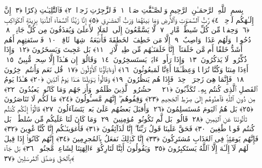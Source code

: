 
  
    
  
    
    

\nopagebreak
  بِسمِ ٱللَّهِ ٱلرَّحمَـٰنِ ٱلرَّحِيمِ
  وَٱلصَّـٰٓفَّٰتِ صَفًّۭا ﴿١﴾
 فَٱلزَّٰجِرَٰتِ زَجرًۭا ﴿٢﴾
 فَٱلتَّٰلِيَـٰتِ ذِكرًا ﴿٣﴾
 إِنَّ إِلَـٰهَكُم لَوَٟحِدٌۭ ﴿٤﴾
 رَّبُّ ٱلسَّمَـٰوَٟتِ وَٱلأَرضِ وَمَا بَينَهُمَا وَرَبُّ ٱلمَشَـٰرِقِ ﴿٥﴾
 إِنَّا زَيَّنَّا ٱلسَّمَآءَ ٱلدُّنيَا بِزِينَةٍ ٱلكَوَاكِبِ ﴿٦﴾
 وَحِفظًۭا مِّن كُلِّ شَيطَٰنٍۢ مَّارِدٍۢ ﴿٧﴾
 لَّا يَسَّمَّعُونَ إِلَى ٱلمَلَإِ ٱلأَعلَىٰ وَيُقذَفُونَ مِن كُلِّ جَانِبٍۢ ﴿٨﴾
 دُحُورًۭا ۖ وَلَهُم عَذَابٌۭ وَاصِبٌ ﴿٩﴾
 إِلَّا مَن خَطِفَ ٱلخَطفَةَ فَأَتبَعَهُۥ شِهَابٌۭ ثَاقِبٌۭ ﴿١٠﴾
 فَٱستَفتِهِم أَهُم أَشَدُّ خَلقًا أَم مَّن خَلَقنَآ ۚ إِنَّا خَلَقنَـٰهُم مِّن طِينٍۢ لَّازِبٍۭ ﴿١١﴾
 بَل عَجِبتَ وَيَسخَرُونَ ﴿١٢﴾
 وَإِذَا ذُكِّرُوا۟ لَا يَذكُرُونَ ﴿١٣﴾
 وَإِذَا رَأَوا۟ ءَايَةًۭ يَستَسخِرُونَ ﴿١٤﴾
 وَقَالُوٓا۟ إِن هَـٰذَآ إِلَّا سِحرٌۭ مُّبِينٌ ﴿١٥﴾
 أَءِذَا مِتنَا وَكُنَّا تُرَابًۭا وَعِظَـٰمًا أَءِنَّا لَمَبعُوثُونَ ﴿١٦﴾
 أَوَءَابَآؤُنَا ٱلأَوَّلُونَ ﴿١٧﴾
 قُل نَعَم وَأَنتُم دَٟخِرُونَ ﴿١٨﴾
 فَإِنَّمَا هِىَ زَجرَةٌۭ وَٟحِدَةٌۭ فَإِذَا هُم يَنظُرُونَ ﴿١٩﴾
 وَقَالُوا۟ يَـٰوَيلَنَا هَـٰذَا يَومُ ٱلدِّينِ ﴿٢٠﴾
 هَـٰذَا يَومُ ٱلفَصلِ ٱلَّذِى كُنتُم بِهِۦ تُكَذِّبُونَ ﴿٢١﴾
 ۞ ٱحشُرُوا۟ ٱلَّذِينَ ظَلَمُوا۟ وَأَزوَٟجَهُم وَمَا كَانُوا۟ يَعبُدُونَ ﴿٢٢﴾
 مِن دُونِ ٱللَّهِ فَٱهدُوهُم إِلَىٰ صِرَٰطِ ٱلجَحِيمِ ﴿٢٣﴾
 وَقِفُوهُم ۖ إِنَّهُم مَّسـُٔولُونَ ﴿٢٤﴾
 مَا لَكُم لَا تَنَاصَرُونَ ﴿٢٥﴾
 بَل هُمُ ٱليَومَ مُستَسلِمُونَ ﴿٢٦﴾
 وَأَقبَلَ بَعضُهُم عَلَىٰ بَعضٍۢ يَتَسَآءَلُونَ ﴿٢٧﴾
 قَالُوٓا۟ إِنَّكُم كُنتُم تَأتُونَنَا عَنِ ٱليَمِينِ ﴿٢٨﴾
 قَالُوا۟ بَل لَّم تَكُونُوا۟ مُؤمِنِينَ ﴿٢٩﴾
 وَمَا كَانَ لَنَا عَلَيكُم مِّن سُلطَٰنٍۭ ۖ بَل كُنتُم قَومًۭا طَٰغِينَ ﴿٣٠﴾
 فَحَقَّ عَلَينَا قَولُ رَبِّنَآ ۖ إِنَّا لَذَآئِقُونَ ﴿٣١﴾
 فَأَغوَينَـٰكُم إِنَّا كُنَّا غَٰوِينَ ﴿٣٢﴾
 فَإِنَّهُم يَومَئِذٍۢ فِى ٱلعَذَابِ مُشتَرِكُونَ ﴿٣٣﴾
 إِنَّا كَذَٟلِكَ نَفعَلُ بِٱلمُجرِمِينَ ﴿٣٤﴾
 إِنَّهُم كَانُوٓا۟ إِذَا قِيلَ لَهُم لَآ إِلَـٰهَ إِلَّا ٱللَّهُ يَستَكبِرُونَ ﴿٣٥﴾
 وَيَقُولُونَ أَئِنَّا لَتَارِكُوٓا۟ ءَالِهَتِنَا لِشَاعِرٍۢ مَّجنُونٍۭ ﴿٣٦﴾
 بَل جَآءَ بِٱلحَقِّ وَصَدَّقَ ٱلمُرسَلِينَ ﴿٣٧﴾
